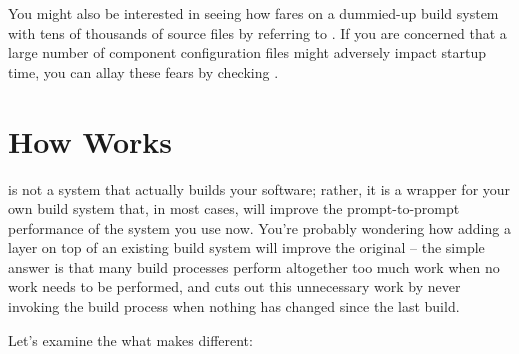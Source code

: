 You might also be interested in seeing how \lmsbw fares on a
dummied-up build system with tens of thousands of source files by
referring to .  If you are concerned that a
large number of component configuration files might adversely impact
startup time, you can allay these fears by checking
.

\section{How \lmsbw Works}

\lmsbw is not a system that actually builds your software; rather, it
is a wrapper for your own build system that, in most cases, will
improve the prompt-to-prompt performance of the system you use now.
You're probably wondering how adding a layer on top of an existing
build system will improve the original -- the simple answer is that
many build processes perform altogether too much work when no work
needs to be performed, and \lmsbw cuts out this unnecessary work by
never invoking the build process when nothing has changed since the
last build.

Let's examine the what makes \lmsbw different:

